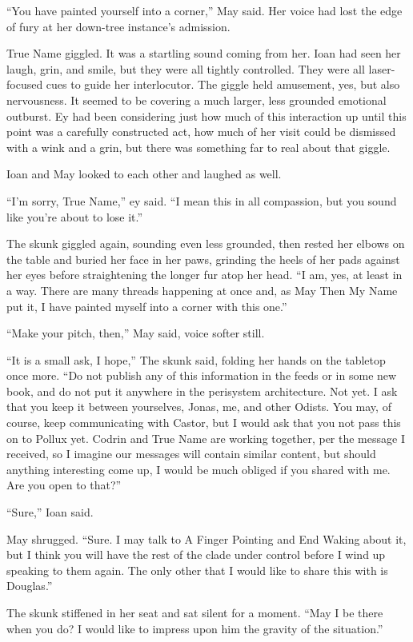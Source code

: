``You have painted yourself into a corner,'' May said. Her voice had lost the edge of fury at her down-tree instance's admission.

True Name giggled. It was a startling sound coming from her. Ioan had seen her laugh, grin, and smile, but they were all tightly controlled. They were all laser-focused cues to guide her interlocutor. The giggle held amusement, yes, but also nervousness. It seemed to be covering a much larger, less grounded emotional outburst. Ey had been considering just how much of this interaction up until this point was a carefully constructed act, how much of her visit could be dismissed with a wink and a grin, but there was something far to real about that giggle.

Ioan and May looked to each other and laughed as well.

``I'm sorry, True Name,'' ey said. ``I mean this in all compassion, but you sound like you're about to lose it.''

The skunk giggled again, sounding even less grounded, then rested her elbows on the table and buried her face in her paws, grinding the heels of her pads against her eyes before straightening the longer fur atop her head. ``I am, yes, at least in a way. There are many threads happening at once and, as May Then My Name put it, I have painted myself into a corner with this one.''

``Make your pitch, then,'' May said, voice softer still.

``It is a small ask, I hope,'' The skunk said, folding her hands on the tabletop once more. ``Do not publish any of this information in the feeds or in some new book, and do not put it anywhere in the perisystem architecture. Not yet. I ask that you keep it between yourselves, Jonas, me, and other Odists. You may, of course, keep communicating with Castor, but I would ask that you not pass this on to Pollux yet. Codrin and True Name are working together, per the message I received, so I imagine our messages will contain similar content, but should anything interesting come up, I would be much obliged if you shared with me. Are you open to that?''

``Sure,'' Ioan said.

May shrugged. ``Sure. I may talk to A Finger Pointing and End Waking about it, but I think you will have the rest of the clade under control before I wind up speaking to them again. The only other that I would like to share this with is Douglas.''

The skunk stiffened in her seat and sat silent for a moment. ``May I be there when you do? I would like to impress upon him the gravity of the situation.''

